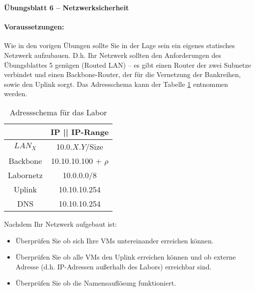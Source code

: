 \documentclass[paper=a4,fontsize=11pt]{scrartcl}%
\numberwithin{equation}{section}
\begin{document}
\begin{center}
\Large{\textbf{Übungsblatt 6 -- Netzwerksicherheit}}
\end{center}
\paragraph{Voraussetzungen:}
Wie in den vorigen Übungen sollte Sie in der Lage sein ein eigenes statisches Netzwerk aufzubauen. D.h. Ihr Netzwerk sollten den Anforderungen des Übungsblattes 5 genügen (Routed LAN) -- es gibt einen Router der zwei Subnetze verbindet und einen Backbone-Router, der für die Vernetzung der Bankreihen, sowie den Uplink sorgt. Das Adressschema kann der Tabelle \ref{adress_scheme} entnommen werden.
\begin{table}[H]
\caption{Adressschema für das Labor}
\label{adress_scheme}
\centering
\begin{tabular}{|c|c|}\hline
 & \textbf{IP  || IP-Range} \\ \hline
 $LAN_X$ & 10.0.$X$.$Y$/Size \\ \hline
 Backbone & 10.10.10.100 + $\rho$ \\ \hline
 Labornetz & 10.0.0.0/8 \\ \hline
 Uplink & 10.10.10.254 \\ \hline
 DNS & 10.10.10.254 \\ \hline
\end{tabular}
\end{table} 
Nachdem Ihr Netzwerk aufgebaut ist:
\begin{itemize}
	\item Überprüfen Sie ob sich Ihre VMs untereinander erreichen können.
	\item Überprüfen Sie ob alle VMs den Uplink erreichen können und ob externe Adresse (d.h. IP-Adressen außerhalb des Labors) erreichbar sind.
	\item Überprüfen Sie ob die Namensauflösung funktioniert.
\end{itemize}
\end{document}
